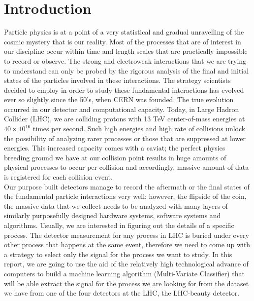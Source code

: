 \chapter*{Introduction}

Particle physics is at a point of a very statistical and gradual unravelling of the cosmic mystery that is our reality. Most of the processes that are of interest in our discipline occur within time and length scales that are practically impossible to record or observe. The strong and electroweak interactions that we are trying to understand can only be probed by the rigorous analysis of the final and initial states of the particles involved in these interactions. The strategy scientists decided to employ in order to study these fundamental interactions has evolved ever so slightly since the 50's, when CERN was founded. The true evolution occurred in our detector and computational capacity. Today, in Large Hadron Collider (LHC), we are colliding protons with 13 TeV center-of-mass energies at \( 40 \times 10^{16} \) times per second. Such high energies and high rate of collisions unlock the possibility of analyzing rarer processes or those that are suppressed at lower energies. This increased capacity comes with a caviat; the perfect physics breeding ground we have at our collision point results in huge amounts of physical processes to occur per collision and accordingly, massive amount of data is registered for each collision event.\\

Our purpose built detectors manage to record the aftermath or the final states of the fundamental particle interactions very well; however, the flipside of the coin, the massive data that we collect needs to be analyzed with many layers of similarly purposefully designed hardware systems, software systems and algorithms. Usually, we are interested in figuring out the details of a specific process. The detector measurement for any process in LHC is buried under every other process that happens at the same event, therefore we need to come up with a strategy to select only the signal for the process we want to study. In this report, we are going to use the aid of the relatively high technological advance of computers to build a machine learning algorithm (Multi-Variate Classifier) that will be able extract the signal for the process we are looking for from the dataset we have from one of the four detectors at the LHC, the LHC-beauty detector.